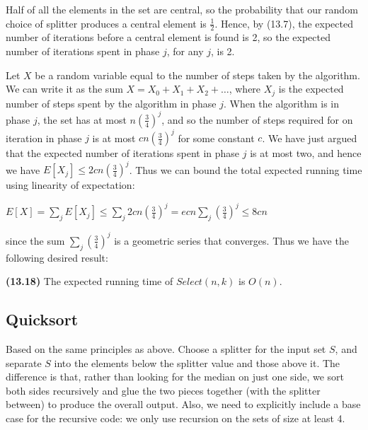 \documentclass{proc}
\begin{document}
Half of all the elements in the set are central, so the probability that our random choice of splitter produces a central element is $\frac{1}{2}$. Hence, by (13.7), the expected number of iterations before a central element is found is 2, so the expected number of iterations spent in phase $j$, for any $j$, is 2.

Let $X$ be a random variable equal to the number of steps taken by the algorithm. We can write it as the sum $X = X_0 + X_1 + X_2 + \ldots$, where $X_j$ is the expected number of steps spent by the algorithm in phase $j$. When the algorithm is in phase $j$, the set has at most $n(\frac{3}{4})^j$, and so the number of steps required for on iteration in phase $j$ is at most $cn(\frac{3}{4})^j$ for some constant $c$. We have just argued that the expected number of iterations spent in phase $j$ is at most two, and hence we have $E[X_j] \le 2cn(\frac{3}{4})^j$. Thus we can bound the total expected running time using linearity of expectation:

$E[X] = \sum_j E[X_j] \le \sum_j 2cn (\frac{3}{4})^j = ecn \sum_j (\frac{3}{4})^j \le 8cn$

since the sum $\sum_j (\frac{3}{4})^j$ is a geometric series that converges. Thus we have the following desired result:

\begin{mdframed}
    \textbf{(13.18)} The expected running time of $Select(n,k)$ is $O(n)$.
\end{mdframed}

\subsection{Quicksort}
Based on the same principles as above. Choose a splitter for the input set $S$, and separate $S$ into the elements below the splitter value and those above it. The difference is that, rather than looking for the median on just one side, we sort both sides recursively and glue the two pieces together (with the splitter between) to produce the overall output. Also, we need to explicitly include a base case for the recursive code: we only use recursion on the sets of size at least 4.
\end{document}

